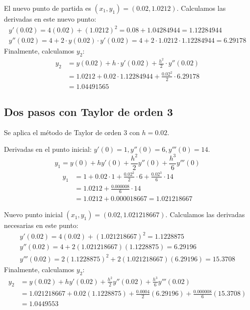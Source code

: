 \documentclass{article}
\begin{document}
El nuevo punto de partida es $(x_1, y_1) = (0.02, 1.0212)$.
Calculamos las derivadas en este nuevo punto:
\begin{gather}
y'(0.02) = 4(0.02) + (1.0212)^2 = 0.08 + 1.04284944 = 1.12284944 \\
y''(0.02) = 4 + 2 \cdot y(0.02) \cdot y'(0.02) = 4 + 2 \cdot 1.0212 \cdot 1.12284944 = 6.29178
\end{gather}
Finalmente, calculamos $y_2$:
\begin{align*}
y_2 &= y(0.02) + h \cdot y'(0.02) + \frac{h^2}{2} \cdot y''(0.02) \\
&= 1.0212 + 0.02 \cdot 1.12284944 + \frac{0.02^2}{2} \cdot 6.29178 \\
&= \boxed{1.04491565}
\end{align*}

\subsection{Dos pasos con Taylor de orden 3}
Se aplica el método de Taylor de orden 3 con $h=0.02$.

Derivadas en el punto inicial: $y'(0)=1, y''(0)=6, y'''(0)=14$.
\begin{equation}
y_1 = y(0) + h y'(0) + \frac{h^2}{2} y''(0) + \frac{h^3}{6} y'''(0)
\end{equation}
\begin{align*}
y_1 &= 1 + 0.02 \cdot 1 + \frac{0.02^2}{2} \cdot 6 + \frac{0.02^3}{6} \cdot 14 \\
&= 1.0212 + \frac{0.000008}{6} \cdot 14 \\
&= 1.0212 + 0.000018667 = 1.021218667
\end{align*}

Nuevo punto inicial $(x_1, y_1) = (0.02, 1.021218667)$.
Calculamos las derivadas necesarias en este punto:
\begin{gather}
y'(0.02) = 4(0.02) + (1.021218667)^2 = 1.1228875 \\
y''(0.02) = 4 + 2(1.021218667)(1.1228875) = 6.29196 \\
y'''(0.02) = 2(1.1228875)^2 + 2(1.021218667)(6.29196) = 15.3708
\end{gather}
Finalmente, calculamos $y_2$:
\begin{align*}
y_2 &= y(0.02) + h y'(0.02) + \frac{h^2}{2} y''(0.02) + \frac{h^3}{6} y'''(0.02) \\
&= 1.021218667 + 0.02(1.1228875) + \frac{0.0004}{2}(6.29196) + \frac{0.000008}{6}(15.3708) \\
&= \boxed{1.0449553}
\end{align*}
\end{document}
